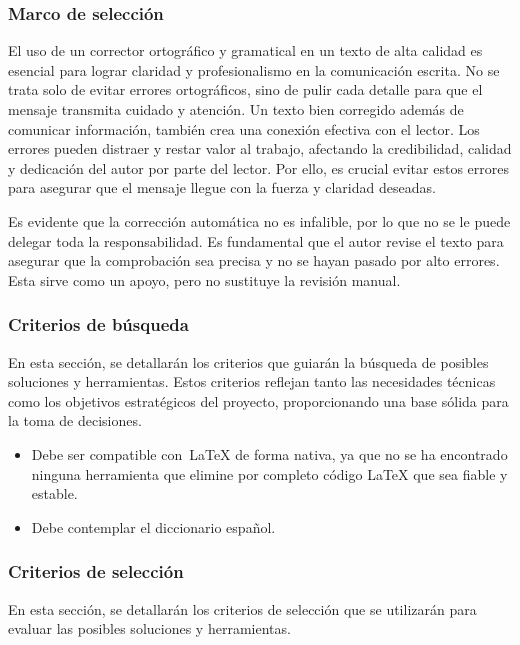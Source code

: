 \subsubsection{Marco de selección}

El uso de un corrector ortográfico y gramatical en un texto de alta calidad es esencial para lograr claridad y profesionalismo en la comunicación escrita. No se trata solo de evitar errores ortográficos, sino de pulir cada detalle para que el mensaje transmita cuidado y atención. Un texto bien corregido además de comunicar información, también crea una conexión efectiva con el lector. Los errores pueden distraer y restar valor al trabajo, afectando la credibilidad, calidad y dedicación del autor por parte del lector. Por ello, es crucial evitar estos errores para asegurar que el mensaje llegue con la fuerza y claridad deseadas.

Es evidente que la corrección automática no es infalible, por lo que no se le puede delegar toda la responsabilidad. Es fundamental que el autor revise el texto para asegurar que la comprobación sea precisa y no se hayan pasado por alto errores. Esta sirve como un apoyo, pero no sustituye la revisión manual.

\subsubsection{Criterios de búsqueda}

En esta sección, se detallarán los criterios que guiarán la búsqueda de posibles soluciones y herramientas. Estos criterios reflejan tanto las necesidades técnicas como los objetivos estratégicos del proyecto, proporcionando una base sólida para la toma de decisiones. 

\begin{itemize}
    \item Debe ser compatible con~\LaTeX{} de forma nativa, ya que no se ha encontrado ninguna herramienta que elimine por completo código \LaTeX{} que sea fiable y estable.
    \item Debe contemplar el diccionario español.
\end{itemize}

\subsubsection{Criterios de selección}

En esta sección, se detallarán los criterios de selección que se utilizarán para evaluar las posibles soluciones y herramientas.

